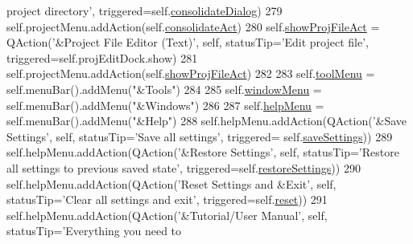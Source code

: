 \begin{DoxyCode}
{       project directory'}, triggered=self.\hyperlink{classsoftware_1_1chipwhisperer_1_1common_1_1ui_1_1CWMainGUI_1_1CWMainGUI_a62689111f7338e5a97db0db1b78c1257}{consolidateDialog})
279         self.projectMenu.addAction(self.\hyperlink{classsoftware_1_1chipwhisperer_1_1common_1_1ui_1_1CWMainGUI_1_1CWMainGUI_ac86fca674ec28f8a83cec133100295c5}{consolidateAct})
280         self.\hyperlink{classsoftware_1_1chipwhisperer_1_1common_1_1ui_1_1CWMainGUI_1_1CWMainGUI_a18eee5ea3164d0d6b6027121a90419fb}{showProjFileAct} = QAction(\textcolor{stringliteral}{'&Project File Editor (Text)'}, self, statusTip=\textcolor{stringliteral}{'Edit
       project file'}, triggered=self.projEditDock.show)
281         self.projectMenu.addAction(self.\hyperlink{classsoftware_1_1chipwhisperer_1_1common_1_1ui_1_1CWMainGUI_1_1CWMainGUI_a18eee5ea3164d0d6b6027121a90419fb}{showProjFileAct})
282 
283         self.\hyperlink{classsoftware_1_1chipwhisperer_1_1common_1_1ui_1_1CWMainGUI_1_1CWMainGUI_a8cf8082d180e6b83174ee18d8f1a596c}{toolMenu} = self.menuBar().addMenu(\textcolor{stringliteral}{"&Tools"})
284 
285         self.\hyperlink{classsoftware_1_1chipwhisperer_1_1common_1_1ui_1_1CWMainGUI_1_1CWMainGUI_af126b8e3d953ccad2f703fe696711b47}{windowMenu} = self.menuBar().addMenu(\textcolor{stringliteral}{"&Windows"})        
286                 
287         self.\hyperlink{classsoftware_1_1chipwhisperer_1_1common_1_1ui_1_1CWMainGUI_1_1CWMainGUI_a225c64fa179e24881bcf11f90bafddcd}{helpMenu} = self.menuBar().addMenu(\textcolor{stringliteral}{"&Help"})
288         self.helpMenu.addAction(QAction(\textcolor{stringliteral}{'&Save Settings'}, self, statusTip=\textcolor{stringliteral}{'Save all settings'}, triggered=
      self.\hyperlink{classsoftware_1_1chipwhisperer_1_1common_1_1ui_1_1CWMainGUI_1_1CWMainGUI_aedaa3d61c9154d8c5254348b53d22c72}{saveSettings}))
289         self.helpMenu.addAction(QAction(\textcolor{stringliteral}{'&Restore Settings'}, self, statusTip=\textcolor{stringliteral}{'Restore all settings to
       previous saved state'}, triggered=self.\hyperlink{classsoftware_1_1chipwhisperer_1_1common_1_1ui_1_1CWMainGUI_1_1CWMainGUI_a5cc3cbfee4ce65aeebe3c727501ac27a}{restoreSettings}))
290         self.helpMenu.addAction(QAction(\textcolor{stringliteral}{'Reset Settings and &Exit'}, self, statusTip=\textcolor{stringliteral}{'Clear all settings and
       exit'}, triggered=self.\hyperlink{classsoftware_1_1chipwhisperer_1_1common_1_1ui_1_1CWMainGUI_1_1CWMainGUI_af000d320113c8af5291c612bc076a7c0}{reset}))
291         self.helpMenu.addAction(QAction(\textcolor{stringliteral}{'&Tutorial/User Manual'}, self, statusTip=\textcolor{stringliteral}{'Everything you need to
}
\end{DoxyCode}
